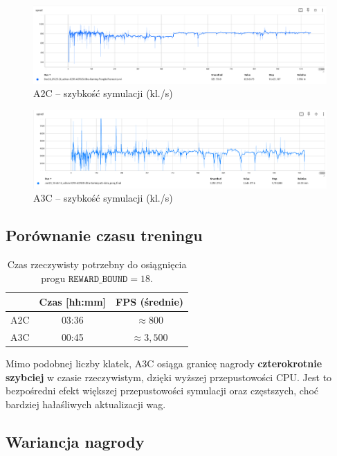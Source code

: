 \documentclass[12pt,a4paper]{article}
\begin{document}
\begin{figure}[H]
  \centering
  \includegraphics[width=.9\linewidth]{images/A2C_speed.png}
  \caption{A2C – szybkość symulacji (kl./s)}
  \label{fig:a2c_speed}
\end{figure}

\begin{figure}[H]
  \centering
  \includegraphics[width=.9\linewidth]{images/A3C_speed.png}
  \caption{A3C – szybkość symulacji (kl./s)}
  \label{fig:a3c_speed}
\end{figure}

\subsection{Porównanie czasu treningu}

\begin{table}[H]
  \centering
  \caption{Czas rzeczywisty potrzebny do osiągnięcia progu
           \(\texttt{REWARD\_BOUND}=18\).}
  \label{tab:time_to_bound}
  \begin{tabular}{@{}lcc@{}}
    \toprule
                 & Czas [hh:mm] & FPS (średnie) \\ \midrule
    A2C          & 03:36        &  \(\approx 800\) \\
    A3C          & 00:45        &  \(\approx 3{,}500\) \\ \bottomrule
  \end{tabular}
\end{table}

Mimo podobnej liczby klatek, A3C osiąga granicę nagrody
\textbf{czterokrotnie szybciej} w czasie rzeczywistym, dzięki wyższej przepustowości
CPU.
Jest to bezpośredni efekt większej przepustowości symulacji
oraz częstszych, choć bardziej hałaśliwych aktualizacji wag.

\subsection{Wariancja nagrody}
\end{document}
